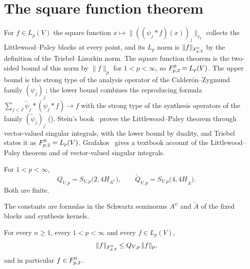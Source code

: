 \section{The square function theorem}
\label{sec:square-function}

For $f \in L_p(V)$ the square function $x \mapsto \|((\psi_j * f)(x))_j\|_{\ell_2}$ collects the
Littlewood--Paley blocks at every point, and its $L_p$ norm is $\|f\|_{F^{0}_{p,2}}$ by the
definition of the Triebel--Lizorkin norm. The square function theorem is the two-sided bound of
this norm by $\|f\|_p$ for $1 < p < \infty$, so $F^{0}_{p,2} = L_p(V)$. The upper bound is the
strong type of the analysis operator of the Calder\'on--Zygmund family $(\psi_j)_j$; the lower
bound combines the reproducing formula
$\sum_{j < J} \tilde\psi_j * (\psi_j * f) \to f$ with the strong type of the synthesis
operators of the family $(\tilde\psi_j)_j$ (). Stein's
book~\cite{SteinSingular} proves the Littlewood--Paley theorem through vector-valued singular
integrals, with the lower bound by duality, and Triebel~\cite{Triebel} states it as
$F^{0}_{p,2} = L_p(V)$. Grafakos~\cite{Grafakos} gives a textbook account of the
Littlewood--Paley theorem and of vector-valued singular integrals.

\begin{definition}
\label{def:square-function-consts}
\leanok
{}
For $1 < p < \infty$,
\[
  Q_{V,p} = S_{V,p}\bigl(2, 4 H_{A^{\psi}}\bigr) , \qquad
  \tilde Q_{V,p} = S_{V,p}\bigl(4, 4 H_{\tilde A}\bigr) .
\]
Both are finite.
\end{definition}

The constants are formulas in the Schwartz seminorms $A^\psi$ and $\tilde A$ of the fixed blocks
and synthesis kernels.

\begin{theorem}
\label{thm:square-function-upper}
\leanok
{}
For every $n \geq 1$, every $1 < p < \infty$ and every $f \in L_p(V)$,
\[
  \|f\|_{F^{0}_{p,2}} \leq Q_{V,p} \, \|f\|_p ,
\]
and in particular $f \in F^{0}_{p,2}$.
\end{theorem}

